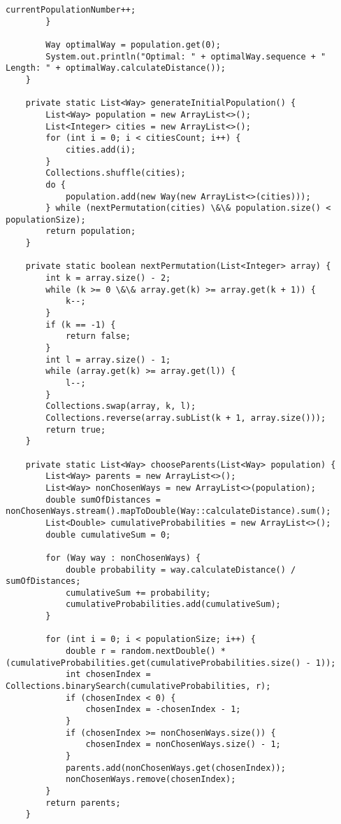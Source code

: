 \documentclass{article}
\begin{document}
\begin{lstlisting}[caption={GeneticAlgorithm}, breaklines=true, linewidth=\textwidth]
            currentPopulationNumber++;
        }

        Way optimalWay = population.get(0);
        System.out.println("Optimal: " + optimalWay.sequence + " Length: " + optimalWay.calculateDistance());
    }

    private static List<Way> generateInitialPopulation() {
        List<Way> population = new ArrayList<>();
        List<Integer> cities = new ArrayList<>();
        for (int i = 0; i < citiesCount; i++) {
            cities.add(i);
        }
        Collections.shuffle(cities);
        do {
            population.add(new Way(new ArrayList<>(cities)));
        } while (nextPermutation(cities) \&\& population.size() < populationSize);
        return population;
    }

    private static boolean nextPermutation(List<Integer> array) {
        int k = array.size() - 2;
        while (k >= 0 \&\& array.get(k) >= array.get(k + 1)) {
            k--;
        }
        if (k == -1) {
            return false;
        }
        int l = array.size() - 1;
        while (array.get(k) >= array.get(l)) {
            l--;
        }
        Collections.swap(array, k, l);
        Collections.reverse(array.subList(k + 1, array.size()));
        return true;
    }

    private static List<Way> chooseParents(List<Way> population) {
        List<Way> parents = new ArrayList<>();
        List<Way> nonChosenWays = new ArrayList<>(population);
        double sumOfDistances = nonChosenWays.stream().mapToDouble(Way::calculateDistance).sum();
        List<Double> cumulativeProbabilities = new ArrayList<>();
        double cumulativeSum = 0;

        for (Way way : nonChosenWays) {
            double probability = way.calculateDistance() / sumOfDistances;
            cumulativeSum += probability;
            cumulativeProbabilities.add(cumulativeSum);
        }

        for (int i = 0; i < populationSize; i++) {
            double r = random.nextDouble() * (cumulativeProbabilities.get(cumulativeProbabilities.size() - 1));
            int chosenIndex = Collections.binarySearch(cumulativeProbabilities, r);
            if (chosenIndex < 0) {
                chosenIndex = -chosenIndex - 1;
            }
            if (chosenIndex >= nonChosenWays.size()) {
                chosenIndex = nonChosenWays.size() - 1;
            }
            parents.add(nonChosenWays.get(chosenIndex));
            nonChosenWays.remove(chosenIndex);
        }
        return parents;
    }



\end{lstlisting}
\end{document}
